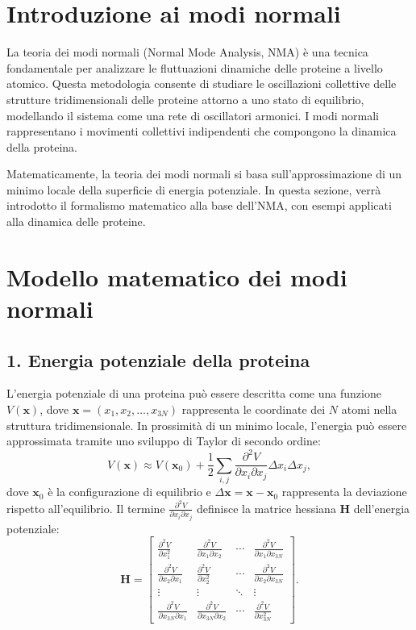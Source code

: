 \documentclass[Lau,binding=0.6cm,oneside,noexaminfo]{sapthesis}
\begin{document}
\section*{Introduzione ai modi normali}
La teoria dei modi normali (Normal Mode Analysis, NMA) è una tecnica fondamentale per analizzare le fluttuazioni dinamiche delle proteine a livello atomico. Questa metodologia consente di studiare le oscillazioni collettive delle strutture tridimensionali delle proteine attorno a uno stato di equilibrio, modellando il sistema come una rete di oscillatori armonici. I modi normali rappresentano i movimenti collettivi indipendenti che compongono la dinamica della proteina.

Matematicamente, la teoria dei modi normali si basa sull'approssimazione di un minimo locale della superficie di energia potenziale. In questa sezione, verrà introdotto il formalismo matematico alla base dell'NMA, con esempi applicati alla dinamica delle proteine.

\section{Modello matematico dei modi normali}

\subsection*{1. Energia potenziale della proteina}
L'energia potenziale di una proteina può essere descritta come una funzione $V(\mathbf{x})$, dove $\mathbf{x} = (x_1, x_2, \dots, x_{3N})$ rappresenta le coordinate dei $N$ atomi nella struttura tridimensionale. In prossimità di un minimo locale, l'energia può essere approssimata tramite uno sviluppo di Taylor di secondo ordine:
\[
V(\mathbf{x}) \approx V(\mathbf{x}_0) + \frac{1}{2} \sum_{i,j} \frac{\partial^2 V}{\partial x_i \partial x_j} \Delta x_i \Delta x_j,
\]
dove $\mathbf{x}_0$ è la configurazione di equilibrio e $\Delta \mathbf{x} = \mathbf{x} - \mathbf{x}_0$ rappresenta la deviazione rispetto all'equilibrio. Il termine $\frac{\partial^2 V}{\partial x_i \partial x_j}$ definisce la matrice hessiana $\mathbf{H}$ dell'energia potenziale:
\[
\mathbf{H} = \begin{bmatrix}
\frac{\partial^2 V}{\partial x_1^2} & \frac{\partial^2 V}{\partial x_1 \partial x_2} & \cdots & \frac{\partial^2 V}{\partial x_1 \partial x_{3N}} \\
\frac{\partial^2 V}{\partial x_2 \partial x_1} & \frac{\partial^2 V}{\partial x_2^2} & \cdots & \frac{\partial^2 V}{\partial x_2 \partial x_{3N}} \\
\vdots & \vdots & \ddots & \vdots \\
\frac{\partial^2 V}{\partial x_{3N} \partial x_1} & \frac{\partial^2 V}{\partial x_{3N} \partial x_2} & \cdots & \frac{\partial^2 V}{\partial x_{3N}^2}
\end{bmatrix}.
\]
\end{document}
